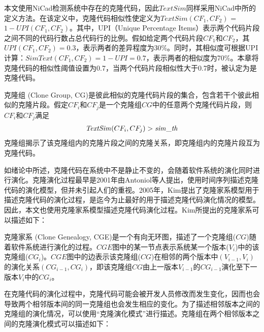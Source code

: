 本文使用NiCad\cite{roy2008nicad}检测系统中存在的克隆代码，因此$\mathit{TextSim}$同样采用NiCad中所的定义方法。在该定义中，克隆代码相似性使定义为$\mathit{TextSim}(CF_1, CF_2)$ = $1 - \mathit{UPI}(CF_1, CF_2)$。其中，UPI（Unique Percentage Items）表示两个代码片段之间不同的代码行数占总代码行的比例。假如给定两个代码片段$CF_1$和$CF_2$，其$\mathit{UPI}(CF_1,CF_2)=0.3$，表示两者的差异程度为30\%。同时，其相似度可根据UPI计算：$\mathit{SimText} (CF_1,CF_2) = 1- \mathit{UPI} = 0.7$，表示两者的相似度为70\%。本章将克隆代码的相似性阈值设置为0.7，当两个代码片段相似性大于0.7时，被认定为是克隆代码。

\begin{definition}[克隆组]
\label {def-clonegroup}
克隆组 (Clone Group, CG)是彼此相似的克隆代码片段的集合，包含若干个彼此相似的克隆片段。假定$CF_i$和$CF_j$是一个克隆组$CG$中的任意两个克隆代码片段，则$CF_i$和$CF_j$满足
\begin{equation} 
  \begin{array}[t]{c}
    \mathit{TextSim}(CF_i, CF_j) > \mathit{sim\_th} \\
  \end{array}
\end{equation}
克隆组揭示了该克隆组内的克隆片段之间的克隆关系，即克隆组内的克隆片段互为克隆代码。
\end {definition}

如绪论中所述，克隆代码在系统中不是静止不变的，会随着软件系统的演化同时进行演化。克隆演化过程最早是2001年由Antoniol等人提出，使用时间序列描述克隆代码的演化模型\cite{antoniol2001modeling}，但并未引起人们的重视。2005年，Kim提出了克隆家系模型用于描述克隆代码的演化过程，是迄今为止最好的用于描述克隆代码演化情况的模型\cite{kim2005empirical}。因此，本文也使用克隆家系模型描述克隆代码演化过程。Kim所提出的克隆家系可以描述如下：

\begin{definition}[克隆家系]
\label{def-clonegenealogy}
克隆家系 (Clone Genealogy, CGE)是一个有向无环图，描述了一个克隆组($CG$)随着软件系统进行演化的过程。$CGE$图中的某一节点表示系统某一个版本($V_i$)中的该克隆组($CG_i$)。$CGE$图中的边表示该克隆组($CG$)在相邻的两个版本中$(V_{i-1},V_i )$的演化关系$(CG_{i-1},CG_{i})$，即该克隆组$CG$由上一版本$V_{i-1}$的$CG_{i-1}$演化至下一版本$V_{i}$中的$CG_{i}$。
\end{definition} 

在克隆代码的演化过程中，克隆代码可能会被开发人员修改而发生变化，因而也会导致两个相邻版本间的同一克隆组也会发生相应的变化。为了描述相邻版本之间的克隆组的演化情况，可以使用“克隆演化模式”进行描述。克隆组在两个相邻版本之间的克隆演化模式可以描述如下：

